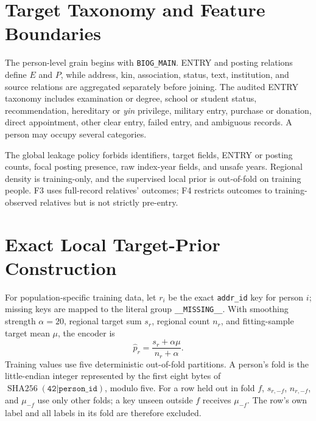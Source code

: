 \documentclass[sigconf]{acmart}
\providecommand{\FloatBarrier}{}
\begin{document}
\FloatBarrier
\clearpage
\label{mainend}



\clearpage
\label{appendixstart}
\appendix
\onecolumn
\setcounter{figure}{0}
\setcounter{table}{0}
\renewcommand{\thefigure}{A\arabic{figure}}
\renewcommand{\thetable}{A\arabic{table}}

\section{Target Taxonomy and Feature Boundaries}
The person-level grain begins with \texttt{BIOG\_MAIN}. ENTRY and posting relations define $E$ and $P$, while address, kin, association, status, text, institution, and source relations are aggregated separately before joining. The audited ENTRY taxonomy includes examination or degree, school or student status, recommendation, hereditary or \emph{yin} privilege, military entry, purchase or donation, direct appointment, other clear entry, failed entry, and ambiguous records. A person may occupy several categories.

The global leakage policy forbids identifiers, target fields, ENTRY or posting counts, focal posting presence, raw index-year fields, and unsafe years. Regional density is training-only, and the supervised local prior is out-of-fold on training people. F3 uses full-record relatives' outcomes; F4 restricts outcomes to training-observed relatives but is not strictly pre-entry.


\section{Exact Local Target-Prior Construction}
For population-specific training data, let \(r_i\) be the exact \texttt{addr\_id} key for person \(i\); missing keys are mapped to the literal group \texttt{\_\_MISSING\_\_}. With smoothing strength \(\alpha=20\), regional target sum \(s_r\), regional count \(n_r\), and fitting-sample target mean \(\mu\), the encoder is
\begin{equation}
\widehat p_r=\frac{s_r+\alpha\mu}{n_r+\alpha}.
\end{equation}
Training values use five deterministic out-of-fold partitions. A person's fold is the little-endian integer represented by the first eight bytes of \(\operatorname{SHA256}(\texttt{42|person\_id})\), modulo five. For a row held out in fold \(f\), \(s_{r,-f}\), \(n_{r,-f}\), and \(\mu_{-f}\) use only other folds; a key unseen outside \(f\) receives \(\mu_{-f}\). The row's own label and all labels in its fold are therefore excluded.
\end{document}
